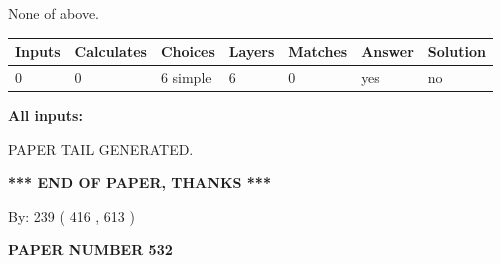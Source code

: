 \documentclass{ctexart}
\begin{document}
 
 None of above.
 
 
\noindent{}
 
 
   
   
   
   
\noindent\begin{tabular}{|l|l|l|l|l|l|l|}
 \hline
Inputs & Calculates & Choices & Layers & Matches & Answer & Solution \\ \hline
 0  & 
 0  & 
 6
  simple  
  & 
 6  & 
 0  & 
  yes & 
  no 
  \\ \hline
 \end{tabular}
   
   
   
   
\noindent{}
   
   
   
   
\noindent\vspace{0.1in}\hspace{-0.08in} {\textbf{\Large{All inputs: }}}
   
   
   
   
   
   
 \vspace{0.2in}
 
   
   
\vspace{2.0in} PAPER TAIL GENERATED.
   
   
   
   
\vspace{1.0in} 
{\textbf{\large{ *** END OF PAPER, THANKS *** }}} 
   
   
\hspace{1.0in} By: 
 239 ( 416 ,  613 )
   
   
   
   
\newpage 
\setcounter{page}{ 
   532001 } 
   
   
   
   
 {\textbf{ \Large{ PAPER NUMBER  532  }}}
   
   
\vspace{0.2in}
   
   
   
   
   
   
   
\end{document}
